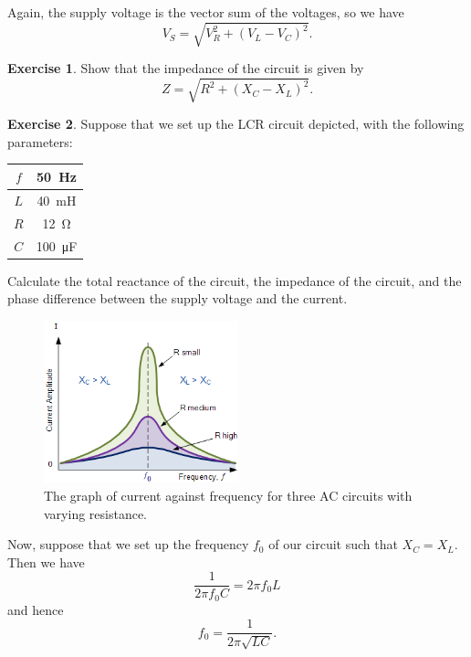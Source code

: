 \documentclass[a4paper]{amsbook}
\theoremstyle{definition}
\newtheorem{exercise}{Exercise}
\numberwithin{exercise}{chapter}
\numberwithin{exercise}{chapter}
\begin{document}
Again, the supply voltage is the vector sum of the voltages, so we have
\begin{equation}
  V_S = \sqrt{V_R^2 + (V_L - V_C)^2}.
\end{equation}

\begin{exercise}
  Show that the impedance of the circuit is given by
  \begin{equation}
    Z = \sqrt{R^2 + (X_C - X_L)^2}.
  \end{equation}
\end{exercise}

\begin{exercise}
  Suppose that we set up the LCR circuit depicted, with the following parameters:
  \begin{center}
    \begin{tabular}{|cc|}\hline
      $ f $ & \SI{50}{\hertz}\\\hline
      $ L $ & \SI{40}{\milli\henry}\\\hline
      $ R $ & \SI{12}{\ohm}\\\hline
      $ C $ & \SI{100}{\micro\farad}\\\hline
    \end{tabular}
  \end{center}
  Calculate the total reactance of the circuit, the impedance of the circuit, and the phase difference between
  the supply voltage and the current.
\end{exercise}

\begin{figure}
  \centering
  \includegraphics[width=0.5\textwidth]{resonance}
  \caption{The graph of current against frequency for three AC circuits with varying resistance.}\label{fig:resonance}
\end{figure}

Now, suppose that we set up the frequency $ f_0 $ of our circuit such that $ X_C = X_L $. Then we have
\begin{displaymath}
  \frac{1}{2\pi f_0 C} = 2\pi f_0 L
\end{displaymath}
and hence
\begin{equation}
  f_0 = \frac{1}{2\pi \sqrt{LC}}.
\end{equation}
\end{document}
